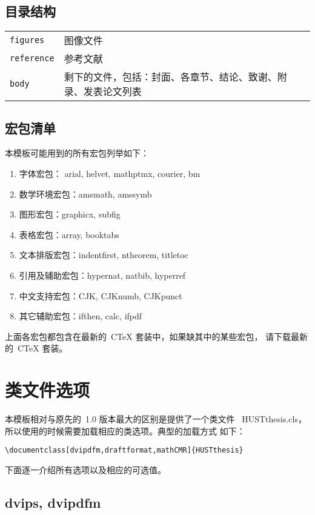 \subsection{目录结构}

\begin{tabular}{l l}
\texttt{figures} & 图像文件\\
\texttt{reference} & 参考文献\\
\texttt{body} & 剩下的文件，包括：封面、各章节、结论、致谢、附录、发表论文列表\\
\end{tabular}

\subsection{宏包清单}

本模板可能用到的所有宏包列举如下：
\begin{enumerate}
\item 字体宏包： arial, helvet, mathptmx, courier, bm
\item 数学环境宏包：amsmath, amssymb
\item 图形宏包：graphicx, subfig
\item 表格宏包：array, booktabs
\item 文本排版宏包：indentfirst, ntheorem, titletoc
\item 引用及辅助宏包：hypernat, natbib, hyperref
\item 中文支持宏包：CJK, CJKnumb, CJKpunct
\item 其它辅助宏包：ifthen, calc, ifpdf
\end{enumerate}
上面各宏包都包含在最新的~C\TeX{} 套装中，如果缺其中的某些宏包，
请下载最新的~C\TeX{} 套装。

\section{类文件选项}
\label{sec:options}

本模板相对与原先的~1.0 版本最大的区别是提供了一个类文件~
HUSTthesis.cls，所以使用的时候需要加载相应的类选项。典型的加载方式
如下：

\verb|\documentclass[dvipdfm,draftformat,mathCMR]{HUSTthesis}|

\noindent 下面逐一介绍所有选项以及相应的可选值。

\subsection{dvips, dvipdfm}

